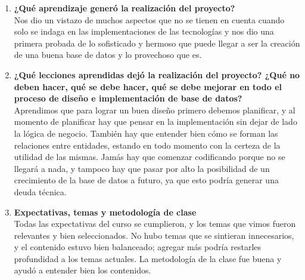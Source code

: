 \begin{enumerate}
    \item \textbf{¿Qué aprendizaje generó la realización del proyecto?} \\
    Nos dio un vistazo de muchos aspectos que no se tienen en cuenta cuando solo se indaga en las implementaciones de las tecnologías y nos dio una primera probada de lo sofisticado y hermoso que puede llegar a ser la creación de una buena base de datos y lo provechoso que es.
    
    \item \textbf{¿Qué lecciones aprendidas dejó la realización del proyecto? ¿Qué no deben hacer, qué se debe hacer, qué se debe mejorar en todo el proceso de diseño e implementación de base de datos?} \\
    Aprendimos que para lograr un buen diseño primero debemos planificar, y al momento de planificar hay que pensar en la implementación sin dejar de lado la lógica de negocio. También hay que entender bien cómo se forman las relaciones entre entidades, estando en todo momento con la certeza de la utilidad de las mismas. Jamás hay que comenzar codificando porque no se llegará a nada, y tampoco hay que pasar por alto la posibilidad de un crecimiento de la base de datos a futuro, ya que esto podría generar una deuda técnica.
    
    \item \textbf{Expectativas, temas y metodología de clase} \\
    Todas las expectativas del curso se cumplieron, y los temas que vimos fueron relevantes y bien seleccionados. No hubo temas que se sintieran innecesarios, y el contenido estuvo bien balanceado; agregar más podría restarles profundidad a los temas actuales. La metodología de la clase fue buena y ayudó a entender bien los contenidos.
\end{enumerate}

